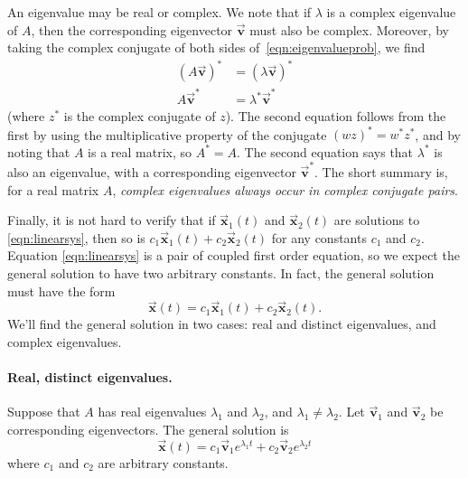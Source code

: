 \documentclass[reqno]{immbook}
\newcommand{\BV}{\vec{\textbf{v}}}
\newcommand{\BX}{\vec{\textbf{x}}}
\begin{document}
An eigenvalue may be real or complex. We note that
if $\lambda$ is a complex eigenvalue of $A$, then
the corresponding eigenvector $\BV$ must also be
complex. Moreover, by taking the complex conjugate
of both sides of~\eqref{eqn:eigenvalueprob},
we find
\begin{equation}
\begin{split}
   (A\BV)^* & = (\lambda \BV)^* \\
   A\BV^* & = \lambda^* \BV^*
\end{split}
\end{equation}
(where $z^*$ is the complex conjugate of $z$).
The second equation follows from the first
by using the multiplicative property of the conjugate
$(wz)^* = w^* z^*$, and
by noting that
$A$ is a real matrix, so $A^*=A$.
The second equation says that $\lambda^*$ is also an eigenvalue,
with a corresponding eigenvector $\BV^*$.
The short summary is, for a real matrix $A$,
\emph{complex eigenvalues always occur in complex conjugate
pairs}.

Finally, it is not hard to verify that if $\BX_1(t)$ and
$\BX_2(t)$ are solutions to \eqref{eqn:linearsys}, then
so is $c_1 \BX_1(t) + c_2\BX_2(t)$ for any constants
$c_1$ and $c_2$.  Equation \eqref{eqn:linearsys} is
a pair of coupled first order equation, so we expect the
general solution to have two arbitrary constants.
In fact, the general solution must have the form
\begin{equation}
  \BX(t) = c_1 \BX_1(t) + c_2 \BX_2(t).
\end{equation}
We'll find the general solution in two cases: real and distinct eigenvalues,
and complex eigenvalues.

\paragraph{Real, distinct eigenvalues.}
Suppose that $A$ has real eigenvalues $\lambda_1$
and $\lambda_2$, and $\lambda_1 \ne \lambda_2$.
Let $\BV_1$ and $\BV_2$ be corresponding eigenvectors.
The general solution is
\begin{equation}
  \BX(t) = c_1 \BV_1 e^{\lambda_1 t} + c_2 \BV_2 e^{\lambda_2 t}
\label{eqn:gensolreal}
\end{equation}
where $c_1$ and $c_2$ are arbitrary constants.
\end{document}
